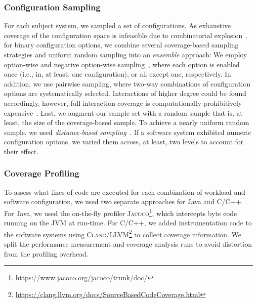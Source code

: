 {\subsubsection{Configuration Sampling}\label{sec:sampling}
For each subject system, we sampled a set of configurations. As exhaustive coverage of the configuration space is infeasible due to combinatorial explosion~\cite{henardCombining2015}, for binary configuration options, we combine several coverage-based sampling strategies and uniform random sampling into an \emph{ensemble} approach: 
We employ option-wise and negative option-wise sampling~\cite{siegmundPerformanceinfluenceModelsHighly2015}, where each option is enabled once (i.e., in, at least, one configuration), or all except one, respectively. In addition, we use pairwise sampling, where two-way combinations of configuration options are systematically selected. Interactions of higher degree could be found accordingly, however, full interaction coverage is computationally prohibitively expensive~\cite{henardCombining2015}. 
Last, we augment our sample set with a random sample that is, at least, the size of the coverage-based sample. To achieve a nearly uniform random sample, we used \emph{distance-based sampling}~\cite{kaltenecker_distance-based_2019}. If a software system exhibited numeric configuration options, we varied them across, at least, two levels to account for their effect. %


\subsubsection{Coverage Profiling}\label{sec:profiling}
{\color{edited}
To assess what lines of code are executed for each combination of workload and software configuration, we used two separate approaches for Java and C/C++. For Java, we used the on-the-fly profiler \textsc{Jacoco}\footnote{\url{https://www.jacoco.org/jacoco/trunk/doc/}}, which intercepts byte code running on the JVM at run-time. For C/C++, we added instrumentation code to the software systems using \textsc{Clang/LLVM}\footnote{\url{https://clang.llvm.org/docs/SourceBasedCodeCoverage.html}} to collect coverage information. We split the performance measurement and coverage analysis runs to  avoid distortion from the profiling overhead.
}
	
}
